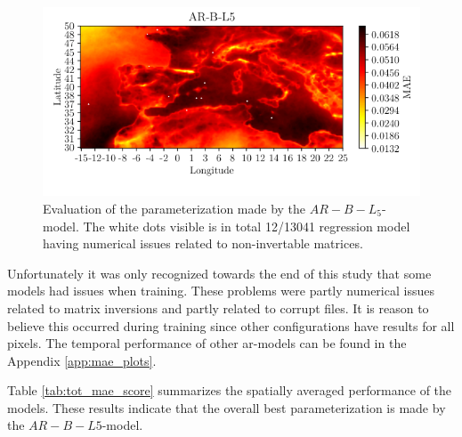 \begin{figure}[ht]
    \centering
    \includegraphics{python_figs/mea_best_ar_model_tcc_L5_in_folder_AR-B-L5.png}
    \caption{Evaluation of the parameterization made by the $AR-B-L_5$-model. The white dots visible is in total 12/13041 regression model having numerical issues related to non-invertable matrices.}
    \label{fig:MAE_AR}
\end{figure}


Unfortunately it was only recognized towards the end of this study that some models had issues when training. These problems were partly numerical issues related to matrix inversions and partly related to corrupt files. It is reason to believe this occurred during training since other configurations have results for all pixels. The temporal performance of other \acrshort{ar}-models can be found in the Appendix \ref{app:mae_plots}.

Table \ref{tab:tot_mae_score} summarizes the spatially averaged performance of the models. These results indicate that the overall best parameterization is made by the $AR-B-L5$-model. %


